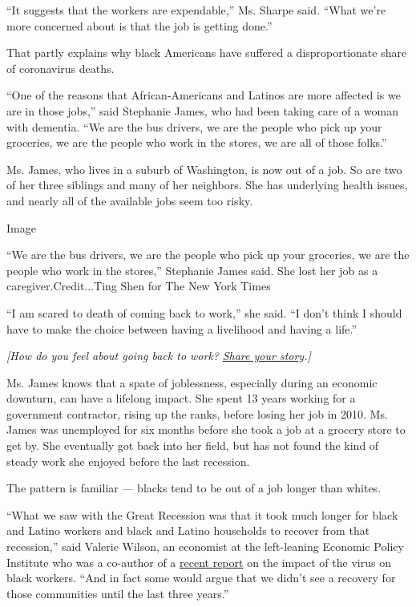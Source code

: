 ``It suggests that the workers are expendable,'' Ms. Sharpe said. ``What
we're more concerned about is that the job is getting done.''

That partly explains why black Americans have suffered a
disproportionate share of coronavirus deaths.

``One of the reasons that African-Americans and Latinos are more
affected is we are in those jobs,'' said Stephanie James, who had been
taking care of a woman with dementia. ``We are the bus drivers, we are
the people who pick up your groceries, we are the people who work in the
stores, we are all of those folks.''

Ms. James, who lives in a suburb of Washington, is now out of a job. So
are two of her three siblings and many of her neighbors. She has
underlying health issues, and nearly all of the available jobs seem too
risky.

Image

``We are the bus drivers, we are the people who pick up your groceries,
we are the people who work in the stores,'' Stephanie James said. She
lost her job as a caregiver.Credit...Ting Shen for The New York Times

``I am scared to death of coming back to work,'' she said. ``I don't
think I should have to make the choice between having a livelihood and
having a life.''

\emph{{[}How do you feel about going back to work?}
\href{https://www.nytimes3xbfgragh.onion/2020/05/15/us/as-cities-reopen-how-do-you-feel-about-going-out.html}{\emph{Share
your story}}\emph{.{]}}

Ms. James knows that a spate of joblessness, especially during an
economic downturn, can have a lifelong impact. She spent 13 years
working for a government contractor, rising up the ranks, before losing
her job in 2010. Ms. James was unemployed for six months before she took
a job at a grocery store to get by. She eventually got back into her
field, but has not found the kind of steady work she enjoyed before the
last recession.

The pattern is familiar --- blacks tend to be out of a job longer than
whites.

``What we saw with the Great Recession was that it took much longer for
black and Latino workers and black and Latino households to recover from
that recession,'' said Valerie Wilson, an economist at the left-leaning
Economic Policy Institute who was a co-author of a
\href{https://www.epi.org/publication/black-workers-covid/}{recent
report} on the impact of the virus on black workers. ``And in fact some
would argue that we didn't see a recovery for those communities until
the last three years.''

